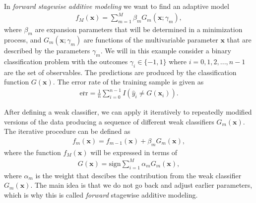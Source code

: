 In \textit{forward stagewise additive modeling} we want to find an adaptive model
\begin{align}
  f_M (\boldsymbol{x}) = \sum_{m=1}^M \beta_m G_m(\boldsymbol{x}; \gamma_m),
\end{align}
where $\beta_m$ are expansion parameters that will be determined in a minimization process, and $G_m(\boldsymbol{x};\gamma_m)$ are functions of the multivariable parameter $\boldsymbol{x}$ that are described by the parameters $\gamma_m$. We will in this example consider a binary classification problem with the outcomes $\gamma_i \in \{-1,1\}$ where $i=0,1,2,...,n-1$ are the set of observables. The predictions are produced by the classification function $G(\boldsymbol{x})$. The error rate of the training sample is given as
\begin{align}
  \overline{\text{err}} = \frac{1}{n} \sum_{i=0}^{n-1} I(\hat{y}_i \neq G(\boldsymbol{x}_i)).
\end{align}

\noindent After defining a weak classifier, we can apply it iteratively to repeatedly modified versions of the data producing a sequence of different weak classifiers $G_m(\boldsymbol{x})$. The iterative procedure can be defined as
\begin{align}
  f_m(\boldsymbol{x}) = f_{m-1}(\boldsymbol{x}) + \beta_mG_m(\boldsymbol{x}),
  \label{eq:fsam}
\end{align}
where the function $f_M(\boldsymbol{x})$ will be expressed in terms of
\begin{align}
  G(\boldsymbol{x})=\text{sign}\sum_{i=1}^M \alpha_mG_m(\boldsymbol{x}),
\end{align}
where $\alpha_m$ is the weight that descibes the contribution from the weak classifier $G_m(\boldsymbol{x})$.
The main idea is that we do not go back and adjust earlier parameters, which is why this is called \textit{forward} stagewise additive modeling.

